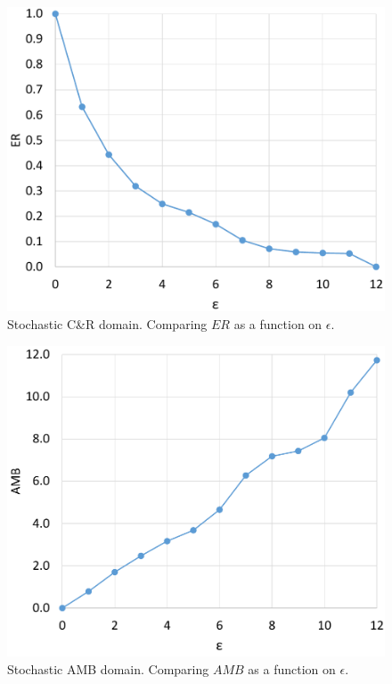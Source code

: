 \documentclass[letterpaper]{article} %
\newcommand{\amb}{\mathit{AMB}}
\newcommand{\er}{\mathit{ER}}
\begin{document}
\begin{figure}
	\centering
	\includegraphics[width=0.8\columnwidth]{Figures/Cops_And_Robber_BAB_depth_chance3_er.pdf}
    \caption{Stochastic C\&R domain. Comparing $\er$ as a function on $\epsilon$.}
	\label{fig:exp-car-chance2}
\end{figure}
\begin{figure}
	\centering
	\includegraphics[width=0.8\columnwidth]{Figures/Cops_And_Robber_BAB_depth_chance3_amb.pdf}
    \caption{Stochastic AMB domain. Comparing $\amb$ as a function on $\epsilon$.}
	\label{fig:exp-car-chance1}
\end{figure}
\end{document}
